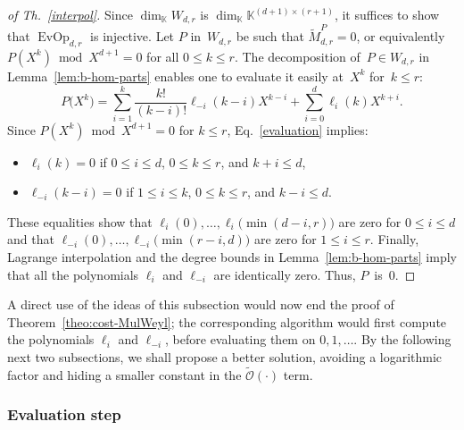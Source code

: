 \documentclass{sig-alt-full}
\newcommand{\x}{X}
\newcommand{\bigOsoft}{\tilde{\mathcal{O}}}
\newcommand{\bK}{\mathbb{K}}
\def\tM{\tilde M}
\begin{document}
\begin{proof}[of Th.~\ref{interpol}]
Since $\dim_{\bK}W_{d,r}$ is $\dim_{\bK}\bK^{(d+1)\times(r+1)}$, it suffices to show that $\operatorname{EvOp}_{d,r}$ is injective.
Let $P$ in~$W_{d,r}$ be such that $\tM^P_{d,r}=0$, or equivalently $P(\x^k) \bmod \x^{d+1} = 0$ for all $0\leq k \leq r$.
The decomposition of~$P\in W_{d,r}$ in Lemma~\ref{lem:b-hom-parts} enables one to evaluate it easily at~$\x^k$ for~$k\leq r$:
\begin{equation}\label{evaluation}
P\bigl(\x^k\bigr) = \sum_{i=1}^k \frac{k!}{(k-i)!} \ell_{-i}(k-i) \x^{k-i} + \sum_{i=0}^d \ell_{i}(k) \x^{k+i}.
\end{equation}
Since $P(\x^k)\bmod\x^{d+1}=0$ for $k\leq r$, Eq.~\eqref{evaluation} implies:
\begin{itemize}
	\item $\ell_i(k)=0$ if $0\leq i\leq d$, $0\leq k\leq r$, and $k+i\leq d$,
	\item $\ell_{-i}(k-i)=0$ if $1\leq i\leq k$, $0\leq k\leq r$, and $k-i\leq d$.
\end{itemize}
These equalities show that $\ell_i(0),\dots,\ell_i\bigl(\min(d-i,r)\bigr)$ are zero for $0\leq i\leq d$ and that $\ell_{-i}(0),\dots,\ell_{-i}\bigl(\min(r-i,d)\bigr)$ are zero for $1\leq i\leq r$.
Finally, Lagrange interpolation and the degree bounds in Lemma~\ref{lem:b-hom-parts} imply that all the polynomials $\ell_i$ and $\ell_{-i}$ are identically zero.
Thus, $P$~is~0.
\end{proof}

A direct use of the ideas of this subsection would now end the proof of Theorem~\ref{theo:cost-MulWeyl};
the corresponding algorithm would first compute the polynomials $\ell_i$ and $\ell_{-i}$, before evaluating them on $0,1,\ldots$.
By the following next two subsections, we shall propose a better solution, avoiding a logarithmic factor and hiding a smaller constant in the $\bigOsoft({\cdot})$ term.


\subsubsection{Evaluation step}
\end{document}
